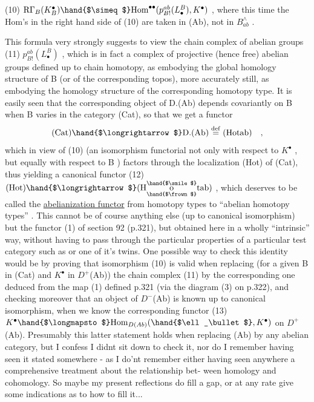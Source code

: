 (10) \qquad $\mathrm{R}\Gamma_B(K^\bullet_B) \hand{$\simeq$} \mathrm{Hom}^{\bullet\bullet}(p^{ab}_{B!}(L^B_\bullet), K^\bullet)$ \quad ,
where this time the Hom's in the  right hand side of (10) are taken
in (Ab), not in $B^\wedge_{ab}$ .

This formula very strongly suggests to view the chain complex of
abelian groups
(11) \qquad $p^{ab}_{B!}(L^B_\bullet)$ \quad ,
which is in fact a complex of projective (hence free) abelian groups
defined up to chain homotopy, as embodying the global homology structure
of B (or of the corresponding topos), more accurately still, as embodying
the homology structure of the corresponding homotopy type. It is easily
seen that the corresponding object of D.(Ab) depends covariantly on B
when B varies in the category (Cat), so that we get a functor
\[ (\mathrm{Cat}) \hand{$\longrightarrow$} \mathrm{D.(Ab)} \overset{\mathrm{def}}{=} (\mathrm{Hotab}) \quad , \]
which in view of (10) (an isomorphism functorial not only  with respect
to $K^\bullet$ , but equally with respect to B ) factors through the localization
(Hot) of (Cat), thus yielding a canonical functor
(12) \qquad $(\mathrm{Hot}) \hand{$\longrightarrow$} (\mathrm{H}\overset{\hand{$\smile$}}{\underset{\hand{$\frown$}}{\mathrm{o}}}\mathrm{tab})$ \quad ,
which deserves to be called the \uline{abelianization functor}\hand{,} from homotopy
types to ``abelian homotopy types'' . This cannot be of course anything else
(up to canonical isomorphism) but the functor (1) of section 92 (p.321),
but obtained here in a wholly ``intrinsic'' way, without having to pass
through the particular properties of a particular test category such as
\hand{$\Delta$} or one of it's twins. One possible way to check this identity would
be by proving that   isomorphism (10) is valid when replacing
(for a given B in (Cat) and $K^\bullet$ in $D^+$(Ab)) the chain complex (11) by the
corresponding one deduced from the map (1) defined p.321 (via the diagram
(3) on p.322), and checking moreover that an object \inserted{$\ell_\bullet$} of $D^-$(Ab) is known
up to canonical isomorphism, when we know the corresponding functor
(13) \qquad $K^\bullet \hand{$\longmapsto$} \mathrm{Hom}_{D(Ab)}(\hand{$\ell_\bullet$} , K^\bullet)$
on $D^+$(Ab). Presumably this latter statement holds when replacing  (Ab)
by any abelian category, but I confess I didnt sit down to check it, nor
do I remember having seen it stated somewhere - as I do'nt remember either
having seen anywhere a comprehensive treatment about the relationship bet-%
ween homology and cohomology. So maybe my present reflections do fill a
gap, or at any rate give some indications as to how to fill it...

